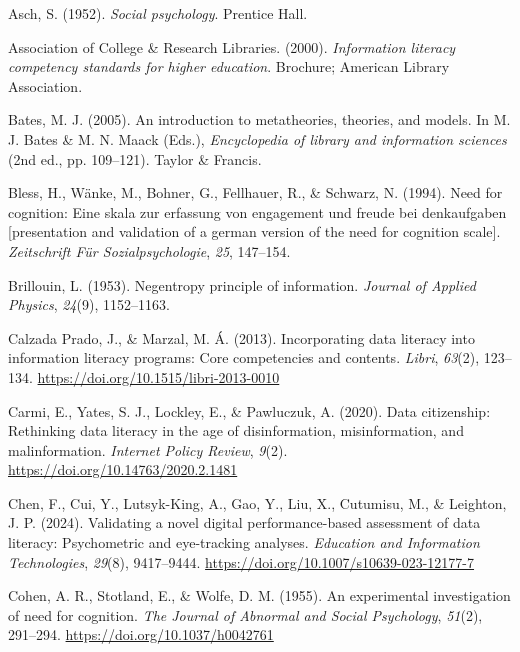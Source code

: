 \documentclass[
  12pt,
  a4paper,
  twoside]{article}
\newlength{\cslhangindent}
\newenvironment{CSLReferences}[2] %
 {\begin{list}{}{%
  \setlength{\itemindent}{0pt}
  \setlength{\leftmargin}{0pt}
  \setlength{\parsep}{0pt}
  \ifodd #1
   \setlength{\leftmargin}{\cslhangindent}
   \setlength{\itemindent}{-1\cslhangindent}
  \fi
  \setlength{\itemsep}{#2\baselineskip}}}
 {\end{list}}
\begin{document}
\label{refs}
\begin{CSLReferences}{1}{0}
Asch, S. (1952). \emph{Social psychology}. Prentice Hall.

Association of College \& Research Libraries. (2000). \emph{Information literacy competency standards for higher education}. Brochure; American Library Association.

Bates, M. J. (2005). An introduction to metatheories, theories, and models. In M. J. Bates \& M. N. Maack (Eds.), \emph{Encyclopedia of library and information sciences} (2nd ed., pp. 109--121). Taylor \& Francis.

Bless, H., Wänke, M., Bohner, G., Fellhauer, R., \& Schwarz, N. (1994). Need for cognition: Eine skala zur erfassung von engagement und freude bei denkaufgaben {[}presentation and validation of a german version of the need for cognition scale{]}. \emph{Zeitschrift Für Sozialpsychologie}, \emph{25}, 147--154.

Brillouin, L. (1953). Negentropy principle of information. \emph{Journal of Applied Physics}, \emph{24}(9), 1152--1163.

Calzada Prado, J., \& Marzal, M. Á. (2013). Incorporating data literacy into information literacy programs: Core competencies and contents. \emph{Libri}, \emph{63}(2), 123--134. \url{https://doi.org/10.1515/libri-2013-0010}

Carmi, E., Yates, S. J., Lockley, E., \& Pawluczuk, A. (2020). Data citizenship: Rethinking data literacy in the age of disinformation, misinformation, and malinformation. \emph{Internet Policy Review}, \emph{9}(2). \url{https://doi.org/10.14763/2020.2.1481}

Chen, F., Cui, Y., Lutsyk-King, A., Gao, Y., Liu, X., Cutumisu, M., \& Leighton, J. P. (2024). Validating a novel digital performance-based assessment of data literacy: Psychometric and eye-tracking analyses. \emph{Education and Information Technologies}, \emph{29}(8), 9417--9444. \url{https://doi.org/10.1007/s10639-023-12177-7}

Cohen, A. R., Stotland, E., \& Wolfe, D. M. (1955). An experimental investigation of need for cognition. \emph{The Journal of Abnormal and Social Psychology}, \emph{51}(2), 291--294. \url{https://doi.org/10.1037/h0042761}


\end{CSLReferences}
\end{document}
